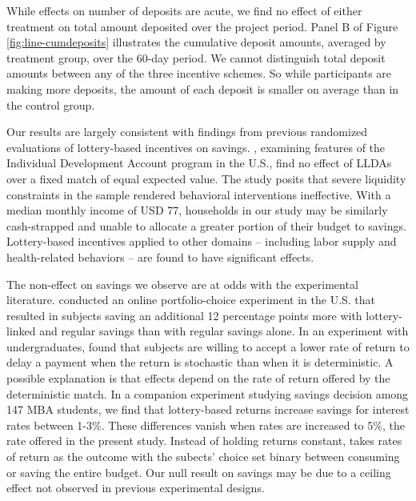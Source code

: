 \documentclass[12pt]{article}
\begin{document}
		While effects on number of deposits are acute, we find no effect of either treatment on total amount deposited over the project period. Panel B of Figure \ref{fig:line-cumdeposits} illustrates the cumulative deposit amounts, averaged by treatment group, over the 60-day period. We cannot distinguish total deposit amounts between any of the three incentive schemes. So while participants are making more deposits, the amount of each deposit is smaller on average than in the control group.

		Our results are largely consistent with findings from previous randomized evaluations of lottery-based incentives on savings. , examining features of the Individual Development Account program in the U.S., find no effect of LLDAs over a fixed match of equal expected value. The study posits that severe liquidity constraints in the sample rendered behavioral interventions ineffective. With a median monthly income of USD 77, households in our study may be similarly cash-strapped and unable to allocate a greater portion of their budget to savings. Lottery-based incentives applied to other domains -- including labor supply  and health-related behaviors  -- are found to have significant effects.


		The non-effect on savings we observe are at odds with the experimental literature.  conducted an online portfolio-choice experiment in the U.S. that resulted in subjects saving an additional 12 percentage points more with lottery-linked and regular savings than with regular savings alone. In an experiment with undergraduates,  found that subjects are willing to accept a lower rate of return to delay a payment when the return is stochastic than when it is deterministic. A possible explanation is that effects depend on the rate of return offered by the deterministic match. In a companion experiment studying savings decision among 147 MBA students, we find that lottery-based returns increase savings for interest rates between 1-3\%. These differences vanish when rates are increased to 5\%, the rate offered in the present study. Instead of holding returns constant,  takes rates of return as the outcome with the subects' choice set binary between consuming or saving the entire budget. Our null result on savings may be due to a ceiling effect not observed in previous experimental designs.
\end{document}
